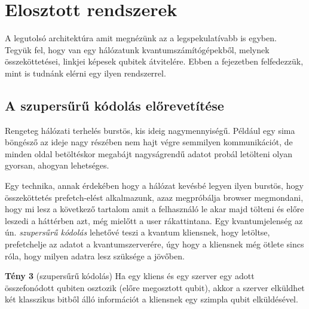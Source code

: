 \chapter{Elosztott rendszerek}\label{sect:distributed}
\hspace{2mm} A legutolsó architektúra amit megnézünk az a legspekulatívabb is egyben.
Tegyük fel, hogy van egy hálózatunk kvantumszámítógépekből, melynek összeköttetései, linkjei képesek qubitek átvitelére.
Ebben a fejezetben felfedezzük, mint is tudnánk elérni egy ilyen rendszerrel.
\section{A szupersűrű kódolás előrevetítése}
\hspace{2mm} Rengeteg hálózati terhelés burstös, kis ideig nagymennyiségű.
Például egy sima böngésző az ideje nagy részében nem hajt végre semmilyen kommunikációt, de minden oldal betöltéskor megabájt nagyságrendű adatot probál letölteni olyan gyorsan, ahogyan lehetséges.

\indent Egy technika, annak érdekében hogy a hálózat kevésbé legyen ilyen burstös, hogy összeköttetés prefetch-elést alkalmazunk, azaz megpróbálja browser megmondani, hogy mi lesz a következő tartalom amit a felhasználó le akar majd tölteni és előre leszedi a háttérben azt, még mielőtt a user rákattintana.
Egy kvantumjelenség az ún. \textit{szupersűrű kódolás} lehetővé teszi a kvantum kliensnek, hogy letöltse, prefetchelje az adatot a kvantumszerverére, úgy hogy a kliensnek még ötlete sincs róla, hogy milyen adatra lesz szüksége a jövőben.

\textbf{Tény 3} (szupersűrű kódolás) Ha egy kliens és egy szerver egy adott összefonódott qubiten osztozik (előre megosztott qubit), akkor a szerver elküldhet két klasszikus bitből álló információt a kliensnek egy szimpla qubit elküldésével.

